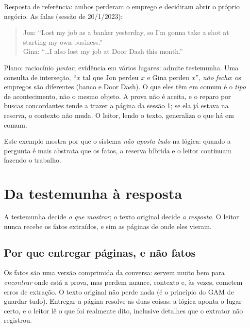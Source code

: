 \documentclass[11pt]{article}
\begin{document}
\begin{exemplo}
Resposta de referência: ambos perderam o emprego e decidiram abrir o próprio
negócio. As falas (sessão de 20/1/2023):
\begin{quote}\small
Jon: ``Lost my job as a banker yesterday, so I'm gonna take a shot at
starting my own business.''\\
Gina: ``\dots I also lost my job at Door Dash this month.''
\end{quote}
Plano: raciocínio \emph{juntar}, evidência em vários lugares: admite
testemunha. Uma consulta de interseção, ``$x$ tal que Jon perdeu $x$ e Gina
perdeu $x$'', \emph{não fecha}: os empregos são diferentes (banco e Door Dash).
O que eles têm em comum é o \emph{tipo} de acontecimento, não o mesmo objeto.
A prova não é aceita, e o reparo por buscas concordantes tende a trazer a
página da sessão 1; se ela já estava na reserva, o contexto não muda. O
leitor, lendo o texto, generaliza o que há em comum.

Este exemplo mostra por que o sistema \emph{não aposta tudo} na lógica:
quando a pergunta é mais abstrata que os fatos, a reserva híbrida e o leitor
continuam fazendo o trabalho.
\end{exemplo}

\section{Da testemunha à resposta}\label{sec:resposta}

\begin{ideia}
A testemunha decide \emph{o que mostrar}; o texto original decide \emph{a
resposta}. O leitor nunca recebe os fatos extraídos, e sim as páginas de
onde eles vieram.
\end{ideia}

\subsection{Por que entregar páginas, e não fatos}

Os fatos são uma versão comprimida da conversa: servem muito bem para
\emph{encontrar} onde está a prova, mas perdem nuance, contexto e, às vezes,
cometem erros de extração. O texto original não perde nada (é o princípio do
GAM de guardar tudo). Entregar a página resolve as duas coisas: a lógica
aponta o lugar certo, e o leitor lê o que foi realmente dito, inclusive
detalhes que o extrator não registrou.
\end{document}
